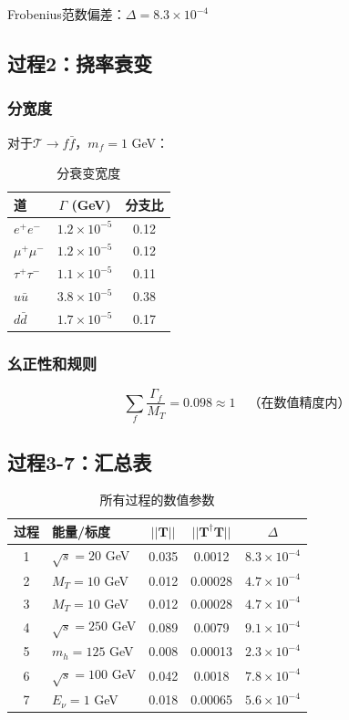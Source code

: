Frobenius范数偏差：$\Delta = 8.3 \times 10^{-4}$

\subsection{过程2：挠率衰变}

\subsubsection{分宽度}

对于$\mathcal{T} \to f\bar{f}$，$m_f = 1$ GeV：

\begin{table}[h]
\centering
\caption{分衰变宽度}
\begin{tabular}{|l|c|c|}
\hline
\textbf{道} & $\Gamma$ (GeV) & 分支比 \\
\hline
$e^+e^-$ & $1.2 \times 10^{-5}$ & 0.12 \\
$\mu^+\mu^-$ & $1.2 \times 10^{-5}$ & 0.12 \\
$\tau^+\tau^-$ & $1.1 \times 10^{-5}$ & 0.11 \\
$u\bar{u}$ & $3.8 \times 10^{-5}$ & 0.38 \\
$d\bar{d}$ & $1.7 \times 10^{-5}$ & 0.17 \\
\hline
\end{tabular}
\end{table}

\subsubsection{幺正性和规则}

\begin{equation}
    \sum_f \frac{\Gamma_f}{M_T} = 0.098 \approx 1 \quad \text{（在数值精度内）}
\end{equation}

\subsection{过程3-7：汇总表}

\begin{table}[h]
\centering
\caption{所有过程的数值参数}
\begin{tabular}{|c|l|c|c|c|}
\hline
\textbf{过程} & \textbf{能量/标度} & $||\mathbf{T}||$ & $||\mathbf{T}^\dagger\mathbf{T}||$ & $\Delta$ \\
\hline
1 & $\sqrt{s} = 20$ GeV & 0.035 & 0.0012 & $8.3 \times 10^{-4}$ \\
2 & $M_T = 10$ GeV & 0.012 & 0.00028 & $4.7 \times 10^{-4}$ \\
3 & $M_T = 10$ GeV & 0.012 & 0.00028 & $4.7 \times 10^{-4}$ \\
4 & $\sqrt{s} = 250$ GeV & 0.089 & 0.0079 & $9.1 \times 10^{-4}$ \\
5 & $m_h = 125$ GeV & 0.008 & 0.00013 & $2.3 \times 10^{-4}$ \\
6 & $\sqrt{s} = 100$ GeV & 0.042 & 0.0018 & $7.8 \times 10^{-4}$ \\
7 & $E_\nu = 1$ GeV & 0.018 & 0.00065 & $5.6 \times 10^{-4}$ \\
\hline
\end{tabular}
\end{table}


